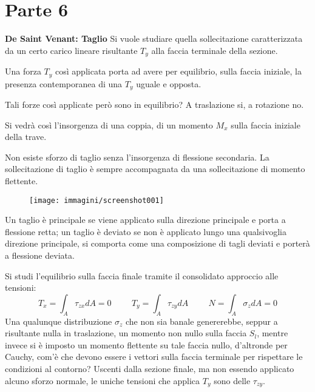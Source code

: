 \documentclass{article}
\def\outcome{\textbf{Learning Outcomes:} Outcomes go here. }
\begin{document}
	\section*{Parte 6} %

\begin{adjustwidth}{2in}{} 
	
\textbf{{\Large De Saint Venant: Taglio}} \mbox{} \newline
		Si vuole studiare quella sollecitazione caratterizzata da un certo carico lineare risultante $T_y$ alla faccia terminale della sezione.
	
		Una forza $T_y$ così applicata porta ad avere per equilibrio, sulla faccia iniziale, la presenza contemporanea di una $T_y$ uguale e opposta. 
	
		Tali forze così applicate però sono in equilibrio? A traslazione si, a rotazione no.
	
		Si vedrà così l'insorgenza di una coppia, di un momento $M_x$ sulla faccia iniziale della trave. \newline 
	
		Non esiste sforzo di taglio senza l'insorgenza di flessione secondaria. La sollecitazione di taglio è sempre accompagnata da una sollecitazione di momento flettente. 
	
\begin{figure}[H]
	\centering
	\texttt{[image: immagini/screenshot001]}
	\label{fig:screenshot001}
\end{figure}


		Un taglio è principale se viene applicato sulla direzione principale e porta a flessione retta; un taglio è deviato se non è applicato lungo una qualsivoglia direzione principale, si comporta come una composizione di tagli deviati e porterà a flessione deviata. \newline 
		
		Si studi l'equilibrio sulla faccia finale tramite il consolidato approccio alle tensioni: 
		\[ T_x = \int_A \tau_{zx}dA  = 0 \hspace{1cm}  T_y = \int_A \tau_{zy}dA  \hspace{1cm} N = \int_A\sigma_zdA = 0\]	
		Una qualunque distribuzione $\sigma_z$ che non sia banale genererebbe, seppur a risultante nulla in traslazione, un momento non nullo sulla faccia $S_l$, mentre invece si è imposto un momento flettente su tale faccia nullo, d'altronde per Cauchy, com'è che devono essere i vettori sulla faccia terminale per rispettare le condizioni al contorno? Uscenti dalla sezione finale, ma non essendo applicato alcuno sforzo normale, le uniche tensioni che applica $T_y$ sono delle $\tau_{zy}$.  \newline 
		

\end{adjustwidth}
\end{document}
